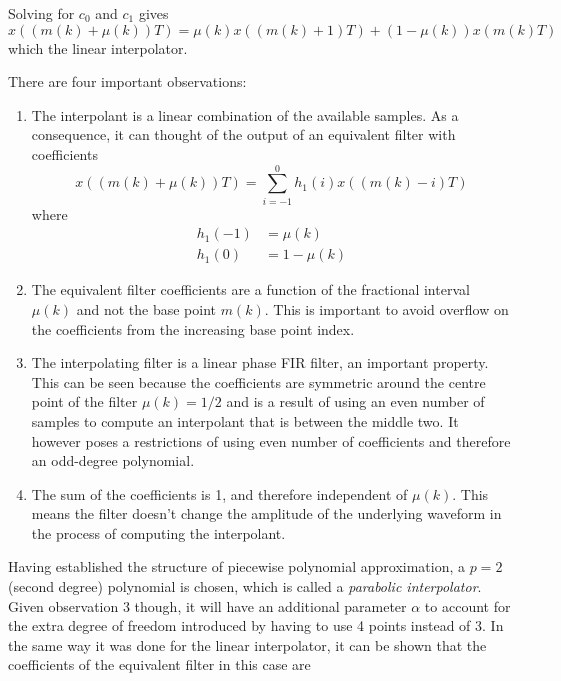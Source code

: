 Solving for $c_0$ and $c_1$ gives
\begin{equation}
x((m(k)+\mu(k))T) = \mu(k)x((m(k)+1)T)+(1-\mu(k))x(m(k)T)
\end{equation}
which the linear interpolator.

There are four important observations:
\begin{enumerate}
  \item The interpolant is a linear combination of the available samples. As a consequence, it can thought of the output of an equivalent filter with coefficients
  \begin{equation}
  x((m(k)+\mu(k))T) = \sum_{i=-1}^{0}h_1(i)x((m(k)-i)T)
  \end{equation}
  where
  \begin{align}
  h_1(-1) &= \mu(k)\\
  h_1(0) &= 1 - \mu(k)
  \end{align}

  \item The equivalent filter coefficients are a function of the fractional interval $\mu(k)$ and not the base point $m(k)$. This is important to avoid overflow on the coefficients from the increasing base point index.

  \item The interpolating filter is a linear phase FIR filter, an important property. This can be seen because the coefficients are symmetric around the centre point of the filter $\mu(k) = 1/2$ and is a result of using an even number of samples to compute an interpolant that is between the middle two. It however poses a restrictions of using even number of coefficients and therefore an odd-degree polynomial.

  \item The sum of the coefficients is 1, and therefore independent of $\mu(k)$. This means the filter doesn't change the amplitude of the underlying waveform in the process of computing the interpolant.
\end{enumerate}

Having established the structure of piecewise polynomial approximation, a $p=2$ (second degree) polynomial is chosen, which is called a \emph{parabolic interpolator}. Given observation 3 though, it will have an additional parameter $\alpha$ to account for the extra degree of freedom introduced by having to use 4 points instead of 3. In the same way it was done for the linear interpolator, it can be shown that the coefficients of the equivalent filter in this case are

